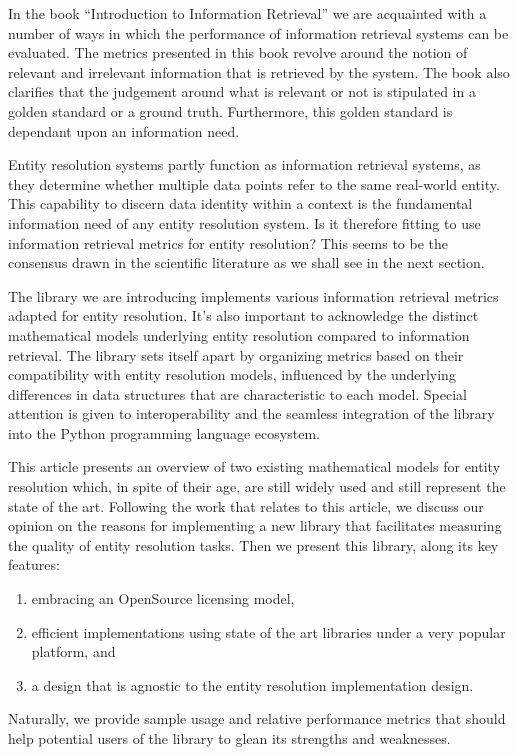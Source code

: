 \documentclass[a4paper,twoside]{article}
\begin{document}
    In the book ``Introduction to Information Retrieval'' we are acquainted with
    a number of ways in which the performance of information retrieval systems
    can be evaluated\cite{manning2008}.
    The metrics presented in this book revolve around the notion of relevant and
    irrelevant information that is retrieved by the system.
    The book also clarifies that the judgement around what is relevant or not is
    stipulated in a golden standard or a ground truth.
    Furthermore, this golden standard is dependant upon an information need.

    Entity resolution systems partly function as information retrieval systems,
    as they determine whether multiple data points refer to the same real-world
    entity.
    This capability to discern data identity within a context is the fundamental
    information need of any entity resolution system.
    Is it therefore fitting to use information retrieval metrics for entity
    resolution?
    This seems to be the consensus drawn in the scientific literature as we
    shall see in the next section.

    The library we are introducing implements various information retrieval
    metrics adapted for entity resolution.
    It's also important to acknowledge the distinct mathematical models
    underlying entity resolution compared to information retrieval.
    The library sets itself apart by organizing metrics based on their
    compatibility with entity resolution models, influenced by the underlying
    differences in data structures that are characteristic to each model.
    Special attention is given to interoperability and the seamless integration
    of the library into the Python programming language ecosystem.

    This article presents an overview of two existing mathematical models for
    entity resolution which, in spite of their age, are still widely used and
    still represent the state of the art.
    Following the work that relates to this article, we discuss our opinion on
    the reasons for implementing a new library that facilitates measuring the
    quality of entity resolution tasks.
    Then we present this library, along its key features:
    \begin{enumerate}
        \item embracing an OpenSource licensing model,
        \item efficient implementations using state of the art libraries under
        a very popular platform, and
        \item a design that is agnostic to the entity resolution implementation
        design.
    \end{enumerate} 
    Naturally, we provide sample usage and relative performance metrics that
    should help potential users of the library to glean its strengths and
    weaknesses.
\end{document}
